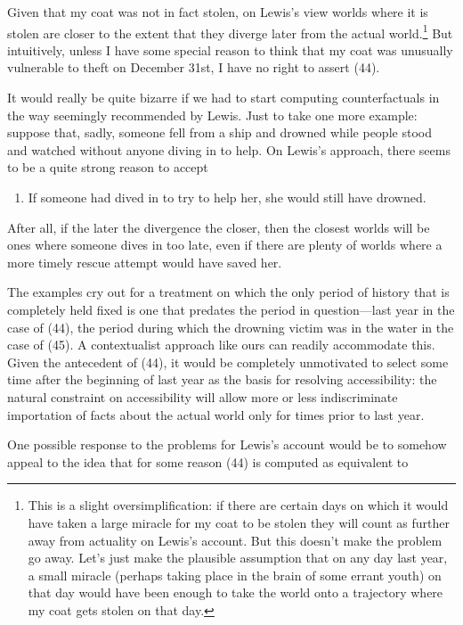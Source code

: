 Given that my coat was not in fact stolen, on Lewis's view worlds where
it is stolen are closer to the extent that they diverge later from the
actual world.\footnote{This is a slight oversimplification: if there are
  certain days on which it would have taken a large miracle for my coat
  to be stolen they will count as further away from actuality on Lewis's
  account. But this doesn't make the problem go away. Let's just make
  the plausible assumption that on any day last year, a small miracle
  (perhaps taking place in the brain of some errant youth) on that day
  would have been enough to take the world onto a trajectory where my
  coat gets stolen on that day.} But intuitively, unless I have some
special reason to think that my coat was unusually vulnerable to theft
on December 31st, I have no right to assert (44).

It would really be quite bizarre if we had to start computing
counterfactuals in the way seemingly recommended by Lewis. Just to take
one more example: suppose that, sadly, someone fell from a ship and
drowned while people stood and watched without anyone diving in to help.
On Lewis's approach, there seems to be a quite strong reason to accept

\begin{enumerate}
\def\labelenumi{(\arabic{enumi})}
\setcounter{enumi}{40}
\itemsep1pt\parskip0pt
\item
  If someone had dived in to try to help her, she would still have
  drowned.
\end{enumerate}

After all, if the later the divergence the closer, then the closest
worlds will be ones where someone dives in too late, even if there are
plenty of worlds where a more timely rescue attempt would have saved
her.

The examples cry out for a treatment on which the only period of history
that is completely held fixed is one that predates the period in
question---last year in the case of (44), the period during which the
drowning victim was in the water in the case of (45). A contextualist
approach like ours can readily accommodate this. Given the antecedent of
(44), it would be completely unmotivated to select some time after the
beginning of last year as the basis for resolving accessibility: the
natural constraint on accessibility will allow more or less
indiscriminate importation of facts about the actual world only for
times prior to last year.

One possible response to the problems for Lewis's account would be to
somehow appeal to the idea that for some reason (44) is computed as
equivalent to

